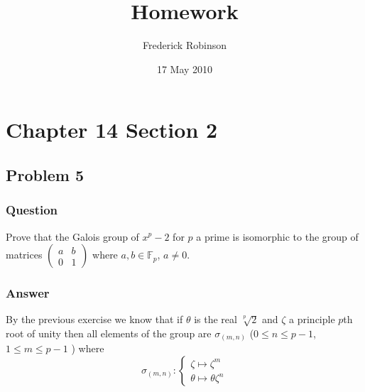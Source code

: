 \documentclass[10pt]{article}
\title{Homework}
\author{Frederick Robinson}
\date{17 May 2010}
\begin{document}

   \maketitle

\setcounter{tocdepth}{2} 


\section{Chapter 14 Section 2}
\subsection{Problem 5}
\subsubsection{Question}
Prove that the Galois group of $x^p-2$ for $p$ a prime is isomorphic to the group of matrices $\left( \begin{array}{cc} a & b \\0&1\end{array}\right)$ where $a, b \in \mathbb{F}_p$, $ a \neq 0$.
\subsubsection{Answer}
By the previous exercise we know that if $\theta$ is the real $\sqrt[p]2$ and $\zeta$ a principle $p$th root of unity then all elements of the group are $\sigma_{(m,n)}$ ($0 \leq n \leq p-1$, $1 \leq m \leq p-1$ ) where
\[\sigma_{(m,n)} : \left\{ \begin{array}{ll} \zeta \mapsto \zeta^m \\ \theta \mapsto \theta\zeta^n  \end{array}\right.  \]
\end{document}

